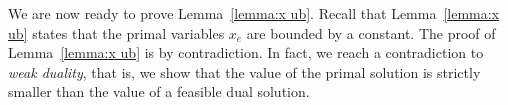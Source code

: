 \documentclass[11pt]{article}
\newenvironment{proof sketch}[1]{\noindent {\emph{Proof sketch of #1:}}}{\hfill \qed}
\newtheorem{coro}{Corollary}
\newcommand{\NNN}{[N]}
\newcommand{\valp}{P}
\newcommand{\PRj}{\Delta_j P}
\newcommand{\event}{\text{$\sigma$}}
\newcommand{\alive}{\text{\textit{Alive}}}
\begin{document}
\begin{comment}
  The following corollary follows from Lemma~\ref{eqn:alive} and from the initialization of the $x_e$ variables to $\frac{1}{4m}$.
\begin{coro}
  For every $t \in \NNN$, after the processing of $\event_t$, it holds that
  $$\valp_t(x,z) = 1 + \sum_{j=0}^{t} \PRj < 1 + |\alive_t|\:.$$
\end{coro}
\end{comment}



We are now ready to prove Lemma~\ref{lemma:x ub}.  Recall that
Lemma~\ref{lemma:x ub} states that the primal variables $x_e$ are
bounded by a constant. The proof of Lemma~\ref{lemma:x ub} is by
contradiction. In fact, we reach a contradiction to \emph{weak
  duality}, that is, we show that the value of the primal solution is
strictly smaller than the value of a feasible dual solution.
\end{document}

